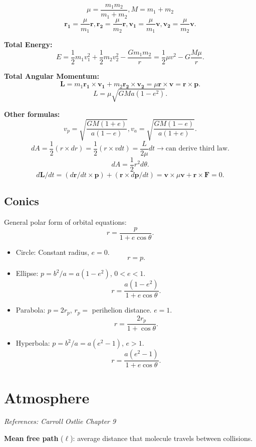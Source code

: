 \documentclass[12pt]{article}
\newcommand{\V}{

\vspace{\baselineskip}

}
\begin{document}
\[\mu = \frac{m_1m_2}{m_1 + m_2}, M = m_1+m_2\]
\[\mathbf{r_1} = \frac{\mu}{m_1}\mathbf{r}, \mathbf{r_2} = \frac{\mu}{m_2}\mathbf{r}, \mathbf{v_1} = \frac{\mu}{m_1}\mathbf{v}, \mathbf{v_2} = \frac{\mu}{m_2}\mathbf{v}.\]

\textbf{Total Energy:}
\[E = \frac{1}{2}m_1v_1^2 + \frac{1}{2}m_2v_2^2 - \frac{Gm_1m_2}{r} =  \frac{1}{2}\mu v^2 - G\frac{M\mu}{r}.\]

\textbf{Total Angular Momentum:}
\[\mathbf{L} = m_1\mathbf{r_1}\times \mathbf{v_1} + m_2\mathbf{r_2}\times\mathbf{v_2} = \mu \mathbf{r}\times \mathbf{v} = \mathbf{r}\times \mathbf{p}.\]
\[L = \mu\sqrt{GMa(1-e^2)}.\]

\textbf{Other formulas:}
\[v_p = \sqrt{\frac{GM(1+e)}{a(1-e)}}, v_a = \sqrt{\frac{GM(1-e)}{a(1+e)}}.\]
\[dA = \frac{1}{2}(r\times dr) = \frac{1}{2}(r\times vdt) = \frac{L}{2\mu}dt\rightarrow \text{can derive third law}.\]
\[dA = \frac{1}{2}r^2d\theta.\]
\[d\mathbf{L}/dt = (d\mathbf{r}/dt\times \mathbf{p}) + (\mathbf{r}\times d\mathbf{p}/dt) = \mathbf{v}\times \mu \mathbf{v} + \mathbf{r}\times \mathbf{F} = 0.\]

\subsection{Conics}

General polar form of orbital equations: 
\[r = \frac{p}{1 + e\cos{\theta}}.\]

\begin{itemize}
    \item Circle: Constant radius, $e=0$.
    \[r = p.\]
    \item Ellipse: $p = b^2/a = a(1-e^2)$, $0 < e < 1$.
    \[r = \frac{a(1-e^2)}{1 + e\cos{\theta}}.\]
    \item Parabola: $p = 2r_p$, $r_p=$ perihelion distance. $e=1$.
    \[r = \frac{2r_p}{1+\cos{\theta}}.\]
    \item Hyperbola: $p = b^2/a = a(e^2-1)$, $e > 1$. 
    \[r = \frac{a(e^2-1)}{1+e\cos{\theta}}.\]
\end{itemize}

\newpage
\section{Atmosphere}

\textit{References: Carroll Ostlie Chapter 9}\V

\textbf{Mean free path} ($\ell$): average distance that molecule travels between collisions. 
\end{document}
